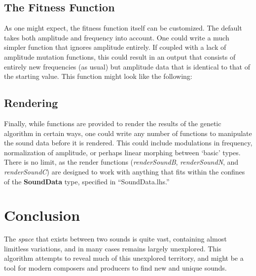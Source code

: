 \documentclass[11pt]{article}
\begin{document}
\subsection{The Fitness Function}

As one might expect, the fitness function itself can be customized. The default takes both amplitude and frequency into account. One could write a much simpler function that ignores amplitude entirely. If coupled with a lack of amplitude mutation functions, this could result in an output that consists of entirely new frequencies (as usual) but amplitude data that is identical to that of the starting value. This function might look like the following:


\subsection{Rendering}

Finally, while functions are provided to render the results of the genetic algorithm in certain ways, one could write any number of functions to manipulate the sound data before it is rendered. This could include modulations in frequency, normalization of amplitude, or perhaps linear morphing between `basic' types. There is no limit, as the render functions (\emph{renderSoundB}, \emph{renderSoundN}, and \emph{renderSoundC}) are designed to work with anything that fits within the confines of the {\bf SoundData} type, specified in ``SoundData.lhs.''

\section{Conclusion}

The \emph{space} that exists between two sounds is quite vast, containing almost limitless variations, and in many cases remains largely unexplored. This algorithm attempts to reveal much of this unexplored territory, and might be a tool for modern composers and producers to find new and unique sounds. 
\end{document}
